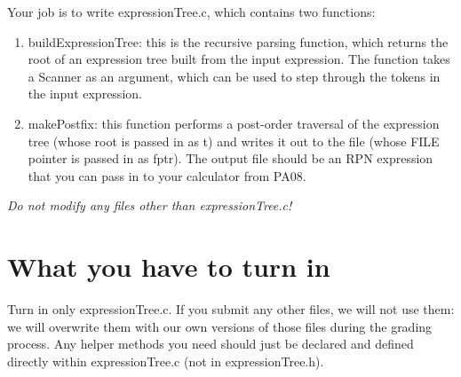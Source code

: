 \documentclass{article}
\begin{document}
Your job is to write \textsf{expressionTree.c}, which contains two functions:


\begin{enumerate}
\item  \textsf{buildExpressionTree}: this is the recursive parsing function, which returns the root of an expression tree built from the input expression. The function takes a \textsf{Scanner} as an argument, which can be used to step through the tokens in the input expression.
\item    \textsf{makePostfix}: this function performs a post-order traversal of the expression tree (whose root is passed in as \textsf{t}) and writes it out to the file (whose \textsf{FILE} pointer is passed in as \textsf{fptr}). The output file should be an RPN expression that you can pass in to your calculator from PA08.
\end{enumerate}

{\em Do not modify any files other than \textsf{expressionTree.c!}}

\section{What you have to turn in}

Turn in only \textsf{expressionTree.c}. If you submit any other files, we will not use them: we will overwrite them with our own versions of those files during the grading process. Any helper methods you need should just be declared and defined directly within \textsf{expressionTree.c} (not in \textsf{expressionTree.h}).
\end{document}
